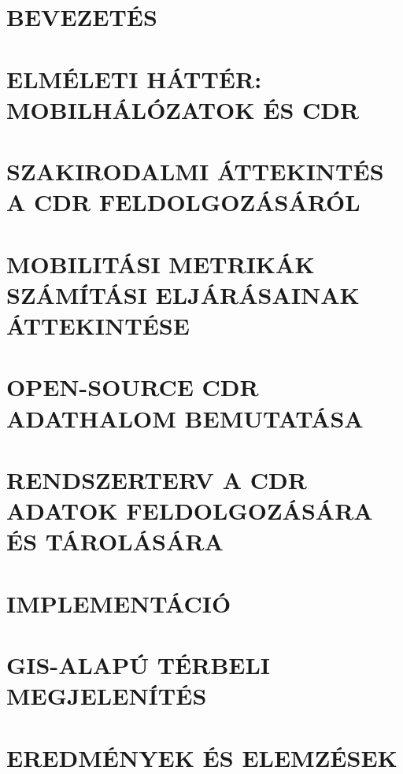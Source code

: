 

\clearpage
\section{BEVEZETÉS}


\clearpage
\section{ELMÉLETI HÁTTÉR: MOBILHÁLÓZATOK ÉS CDR}



\clearpage
\section{SZAKIRODALMI ÁTTEKINTÉS A CDR FELDOLGOZÁSÁRÓL}


\clearpage
\section{MOBILITÁSI METRIKÁK SZÁMÍTÁSI ELJÁRÁSAINAK ÁTTEKINTÉSE}


\clearpage
\section{OPEN-SOURCE CDR ADATHALOM BEMUTATÁSA}


\clearpage
\section{RENDSZERTERV A CDR ADATOK FELDOLGOZÁSÁRA ÉS TÁROLÁSÁRA}


\clearpage
\section{IMPLEMENTÁCIÓ}


\clearpage
\section{GIS-ALAPÚ TÉRBELI MEGJELENÍTÉS}


\clearpage
\section{EREDMÉNYEK ÉS ELEMZÉSEK}


